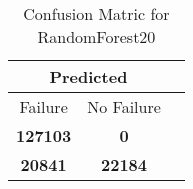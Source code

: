\begin{table}[] 
\caption{Confusion Matric for RandomForest20} 
\label{Table: Prediction Accuracy-DMDRandomForest20OnlySunEKF-resetReflectionperfectNoFailurePrediction-Reflection} 
\centering 
\begin{tabular} 
 {@{}ccc@{}} 
\toprule 
\multicolumn{2}{c}{\textbf{Predicted}}
 \\ \midrule 
\multicolumn{1}{|c|}{Failure} & 
\multicolumn{1}{c|}{No Failure}
 \\ \midrule 
\multicolumn{1}{|c|}{\color{green}\textbf{127103}} & 
\multicolumn{1}{c|}{\color{red}\textbf{0}}
 \\ \midrule 
\multicolumn{1}{|c|}{\color{red}\textbf{20841}} & 
\multicolumn{1}{c|}{\color{green}\textbf{22184}}
 \\ \bottomrule 
\end{tabular} 
\end{table} 

